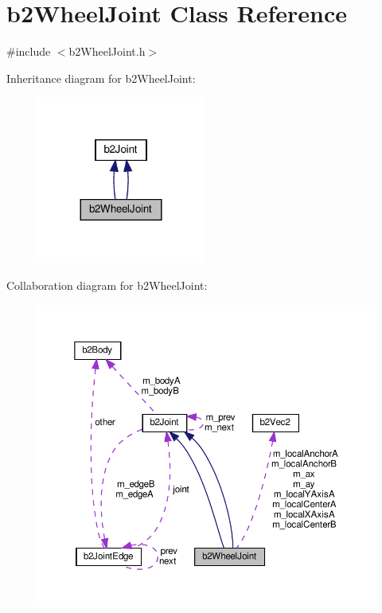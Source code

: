 \hypertarget{classb2WheelJoint}{}\section{b2\+Wheel\+Joint Class Reference}
\label{classb2WheelJoint}


{\ttfamily \#include $<$b2\+Wheel\+Joint.\+h$>$}



Inheritance diagram for b2\+Wheel\+Joint\+:
\nopagebreak
\begin{figure}[H]
\begin{center}
\leavevmode
\includegraphics[width=156pt]{classb2WheelJoint__inherit__graph}
\end{center}
\end{figure}


Collaboration diagram for b2\+Wheel\+Joint\+:
\nopagebreak
\begin{figure}[H]
\begin{center}
\leavevmode
\includegraphics[width=350pt]{classb2WheelJoint__coll__graph}
\end{center}
\end{figure}
